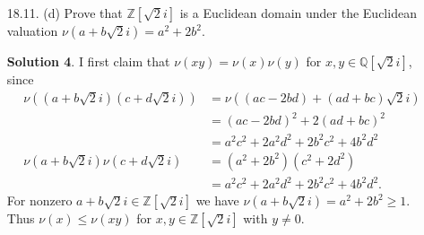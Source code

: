 \documentclass{article}
\newcommand{\QQ}{\mathbb{Q}}
\newcommand{\ZZ}{\mathbb{Z}}
\theoremstyle{definition}
\newtheorem*{solution}{Solution}
\begin{document}
\begin{enumerate}
\begin{enumerate}
\begin{solution}
Finally, supposed $E'$ is another prime subfield of $F$.  By the construction of $E$, $E \subseteq E'$.  Since $E'$ is a prime subfield, we must have $E' = E$.
\end{solution}
\item If $F$ is a field of characteristic $0$, prove that the prime subfield of $F$ is isomorphic to $\QQ$.
\begin{solution} 
Define a homomorphism $\phi : \ZZ \to F$ by $\phi(n) = n \cdot 1_F$.  Since $F$ has characteristic $0$, this homomorphism is injective, so its image is a subring of $F$ isomorphic to $\ZZ$.  Now by Theorem 18.4, $F$ contains a subfield isomorphic to $\QQ$.  Since $\QQ$ has no subfields it is prime, and thus by part (a) is the unique prime subfield of $F$.
\end{solution}
\item If $F$ is a field of characteristic $p$, prove that the prime subfield of $F$ is isomorphic to $\ZZ_p$.
\begin{solution} 
Define $\phi : \ZZ \to F$ as in part (b).  Since $F$ has characteristic $p$, $\phi$ has kernel $p\ZZ$ and thus by the first isomorphism theorem its image is isomorphic to $\ZZ/p\ZZ$, which is a prime field.  By part (a), this is the unique prime subfield of $F$.
\end{solution}
\end{enumerate}
\item[18.11. (d)] Prove that $\ZZ[\sqrt{2}i]$ is a Euclidean domain under the Euclidean valuation $\nu(a + b\sqrt{2}i) = a^2 + 2b^2$.
\begin{solution}
I first claim that $\nu(xy) = \nu(x)\nu(y)$ for $x, y \in \QQ[\sqrt{2}i]$, since
\begin{align*}
\nu((a+b\sqrt{2}i)(c+d\sqrt{2}i)) &= \nu((ac - 2bd) + (ad + bc)\sqrt{2}i) \\
&= (ac - 2bd)^2 + 2(ad + bc)^2 \\
&= a^2c^2 + 2a^2d^2 + 2b^2c^2 + 4b^2d^2 \\
\nu(a+b\sqrt{2}i)\nu(c+d\sqrt{2}i) &= (a^2 + 2b^2)(c^2 + 2d^2) \\
&= a^2c^2 + 2a^2d^2 + 2b^2c^2 + 4b^2d^2.
\end{align*}
For nonzero $a + b\sqrt{2}i \in \ZZ[\sqrt{2}i]$ we have $\nu(a + b\sqrt{2}i) = a^2 + 2b^2 \ge 1$.  Thus $\nu(x) \le \nu(xy)$ for $x,y \in \ZZ[\sqrt{2}i]$ with $y \ne 0$.


\end{solution}
\end{enumerate}
\end{document}
